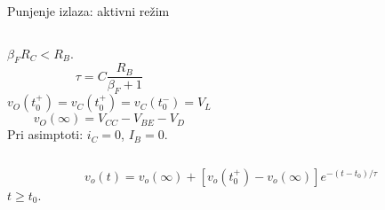 \begin{frame}[label=10-s063]{Punjenje izlaza: aktivni režim}
\setlength{\abovedisplayskip}{4pt}\setlength{\belowdisplayskip}{4pt}\setlength{\abovedisplayshortskip}{3pt}\setlength{\belowdisplayshortskip}{3pt}
\begin{columns}[T,onlytextwidth]\centering{}\centering{}\centering \raggedright
$\beta_FR_C<R_B$.
\[\tau=C\frac{R_B}{\beta_F+1}\]
\[v_O(t_0^+)=v_C(t_0^+)=v_C(t_0^-)=V_L\]
\[v_O(\infty)=V_{CC}-V_{BE}-V_D\]
Pri asimptoti: $i_C=0$, $I_B=0$.\end{columns}\vspace{1pt}
\[v_o(t)=v_o(\infty)+[v_o(t_0^+)-v_o(\infty)]e^{-(t-t_0)/\tau}\]\centering $t\geq t_0$.
\end{frame}
